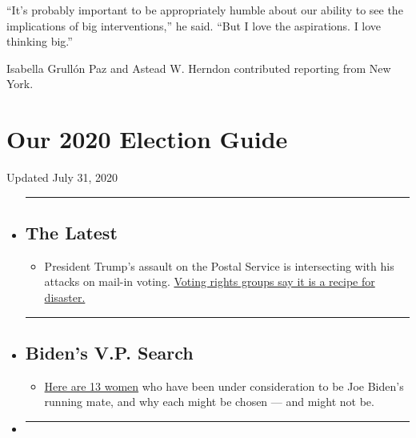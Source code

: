 ``It's probably important to be appropriately humble about our ability
to see the implications of big interventions,'' he said. ``But I love
the aspirations. I love thinking big.''

Isabella Grullón Paz and Astead W. Herndon contributed reporting from
New York.

\hypertarget{our-2020-election-guide}{%
\section{Our 2020 Election Guide}\label{our-2020-election-guide}}

Updated July 31, 2020

\begin{itemize}
\item
  \begin{center}\rule{0.5\linewidth}{\linethickness}\end{center}

  \hypertarget{the-latest}{%
  \subsection{The Latest}\label{the-latest}}

  \begin{itemize}
  \tightlist
  \item
    President Trump's assault on the Postal Service is intersecting with
    his attacks on mail-in voting.
    \href{https://www.nytimes.com/2020/07/31/us/politics/trump-usps-mail-delays.html?action=click\&pgtype=Article\&state=default\&region=BELOW_MAIN_CONTENT\&context=storylines_guide}{Voting
    rights groups say it is a recipe for disaster.}
  \end{itemize}
\item
  \begin{center}\rule{0.5\linewidth}{\linethickness}\end{center}

  \hypertarget{bidens-vp-search}{%
  \subsection{Biden's V.P. Search}\label{bidens-vp-search}}

  \begin{itemize}
  \tightlist
  \item
    \href{https://www.nytimes.com/article/biden-vice-president-2020.html?action=click\&pgtype=Article\&state=default\&region=BELOW_MAIN_CONTENT\&context=storylines_guide}{Here
    are 13 women} who have been under consideration to be Joe Biden's
    running mate, and why each might be chosen --- and might not be.
  \end{itemize}
\item
  \begin{center}\rule{0.5\linewidth}{\linethickness}\end{center}


\end{itemize}
